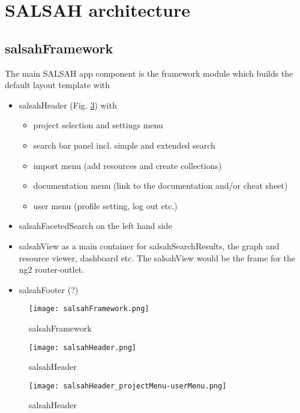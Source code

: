 \newpage
\section{SALSAH architecture}
\subsection{salsahFramework}
The main SALSAH app component is the framework module which builds the default layout template with

\begin{itemize}
	\item salsahHeader (Fig. \ref{fig:header}) with
	\begin{itemize}
		\item project selection and settings menu
		\item search bar panel incl. simple and extended search
		\item import menu (add resources and create collections)
		\item documentation menu (link to the documentation and/or cheat sheet)
		\item user menu (profile setting, log out etc.)
	\end{itemize}
	\item salsahFacetedSearch on the left hand side
	\item salsahView as a main container for salsahSearchResults, the graph and resource viewer, dashboard etc. The salsahView would be the frame for the ng2 router-outlet.
	\item salsahFooter (?)
\end{itemize}

\begin{figure}[h]
    \centering
    \texttt{[image: salsahFramework.png]}
    \caption{salsahFramework}
    \label{fig:framework}
\end{figure}

\begin{figure}[h]
    \centering
    \texttt{[image: salsahHeader.png]}
    \caption{salsahHeader}
    \label{fig:header}
\end{figure}

\begin{figure}[h]
    \centering
    \texttt{[image: salsahHeader\_projectMenu-userMenu.png]}
    \caption{salsahHeader}
    \label{fig:header}
\end{figure}

% 

